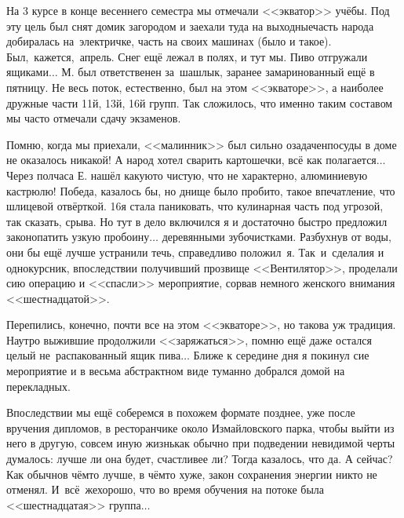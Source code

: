 На 3 курсе в конце весеннего семестра мы отмечали <<экватор>> учёбы. Под эту цель был снят домик загородом и заехали туда на выходные\mdash часть народа добиралась на~электричке, часть на своих машинах (было и такое). Был,~кажется,~апрель. Снег ещё лежал в полях, и тут мы. Пиво отгружали ящиками$\ldots$ М. был ответственен за~шашлык, заранее замаринованный ещё в пятницу. Не весь поток, естественно, был на этом <<экваторе>>, а наиболее дружные части 11\sdash й, 13\sdash й, 16\sdash й групп. Так сложилось, что именно таким составом мы часто отмечали сдачу экзаменов.

Помню, когда мы приехали, <<малинник>> был сильно озадачен\mdash посуды в доме не оказалось никакой! А народ хотел сварить картошечки, всё как полагается$\ldots$ Через полчаса Е. нашёл какую\sdash то чистую, что не характерно, алюминиевую кастрюлю! Победа, казалось бы, но днище было пробито, такое впечатление, что шлицевой отвёрткой. 16\sdash я стала паниковать, что кулинарная часть под угрозой, так сказать, срыва. Но тут в дело включился я и достаточно быстро предложил законопатить узкую пробоину$\ldots$ деревянными зубочистками. Разбухнув от воды, они бы ещё лучше устранили течь, справедливо положил~я. Так~и~сделали\mdash я и однокурсник, впоследствии получивший прозвище <<Вентилятор>>, проделали сию операцию и <<спасли>> мероприятие, сорвав немного женского внимания <<шестнадцатой>>.

Перепились, конечно, почти все на этом <<экваторе>>, но такова уж традиция. Наутро выжившие продолжили <<заряжаться>>, помню ещё даже остался целый не~распакованный ящик пива$\ldots$ Ближе к середине дня я покинул сие мероприятие и в весьма абстрактном виде туманно добрался домой на перекладных. 

Впоследствии мы ещё соберемся в похожем формате позднее, уже после вручения дипломов, в ресторанчике около Измайловского парка, чтобы выйти из него в другую, совсем иную жизнь\mdash как обычно при подведении невидимой черты думалось: лучше ли она будет, счастливее ли? Тогда казалось, что да. А сейчас? Как обычно\mdash в чём\sdash то лучше, в чём\sdash то хуже, закон сохранения энергии никто не отменял. И~всё~же\mdash хорошо, что во время обучения на потоке была <<шестнадцатая>> группа$\ldots$ %

\begin{center}
\end{center}